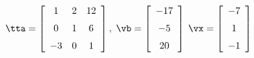 {$\tta = \left[ \begin {array}{ccc} 1&2&12\\\noalign{\medskip}0&1&6
\\\noalign{\medskip}-3&0&1\end {array} \right],$
 \quad
$\vb = \left[ \begin {array}{c} -17\\\noalign{\medskip}-5
\\\noalign{\medskip}20\end {array} \right]$ 
}
{$\vx = \left[ \begin {array}{c} -7\\\noalign{\medskip}1\\\noalign{\medskip}-
1\end {array} \right]$}
